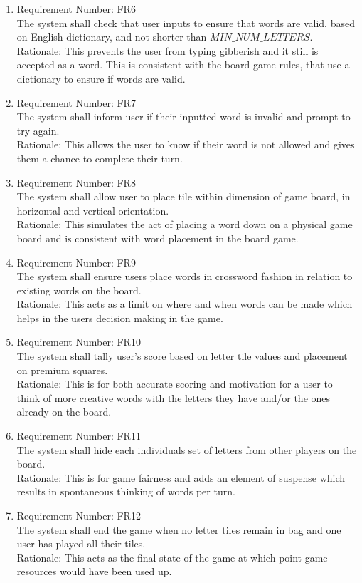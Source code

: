 \documentclass[12pt, titlepage]{article}
\begin{document}
\begin{enumerate}
    \item 
    Requirement Number: FR6 \\
    The system shall check that user inputs to ensure that words are valid, based on English dictionary, and not shorter than $MIN\_NUM\_LETTERS$. \\
    Rationale: This prevents the user from typing gibberish and it still is accepted as a word. This is consistent with the board game rules, that use a dictionary to ensure if words are valid.\\
    \item 
     Requirement Number: FR7 \\
     The system shall inform user if their inputted word is invalid and prompt to try again.\\
     Rationale: This allows the user to know if their word is not allowed and gives them a chance to complete their turn.\\
    \item 
     Requirement Number: FR8 \\ %
     The system shall allow user to place tile within dimension of game board, in horizontal and vertical orientation.\\
     Rationale: This simulates the act of placing a word down on a physical game board and is consistent with word placement in the board game.\\
    \item
    Requirement Number: FR9 \\
    The system shall ensure users place words in crossword fashion in relation to existing words on the board.\\
    Rationale: This acts as a limit on where and when words can be made which helps in the users decision making in the game.\\
    \item 
    Requirement Number: FR10 \\
    The system shall tally user's score based on letter tile values and placement on premium squares.\\
    Rationale: This is for both accurate scoring and motivation for a user to think of more creative words with the letters they have and/or the ones already on the board.\\
    \item 
    Requirement Number: FR11 \\
    The system shall hide each individuals set of letters from other players on the board.\\
    Rationale: This is for game fairness and adds an element of suspense which results in spontaneous thinking of words per turn.\\
    \item
    Requirement Number: FR12 \\
    The system shall end the game when no letter tiles remain in bag and one user has played all their tiles.\\
    Rationale: This acts as the final state of the game at which point game resources would have been used up.\\
\end{enumerate}
\end{document}
